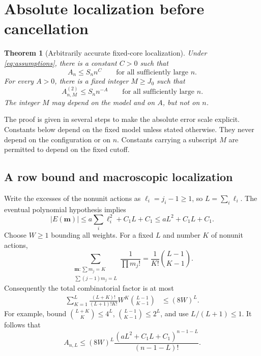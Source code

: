 \documentclass[11pt,a4paper]{article}
\numberwithin{equation}{section}
\newtheorem{theorem}{Theorem}[section]
\theoremstyle{definition}\newtheorem{definition}[theorem]{Definition}
\theoremstyle{remark}\newtheorem{remark}[theorem]{Remark}
\theoremstyle{definition}
\begin{document}
\section{Absolute localization before cancellation}
\label{sec:localization}

\begin{theorem}[Arbitrarily accurate fixed-core localization]
\label{thm:localization}
Under \eqref{eq:assumptions}, there is a constant \(C>0\) such that
\begin{equation}
 A_n\le S_n n^C
 \qquad\text{for all sufficiently large }n.
 \label{eq:absolute-total}
\end{equation}
For every \(A>0\), there is a fixed integer \(M\ge J_0\) such that
\begin{equation}
 A_{n,M}^{(2)}\le S_n n^{-A}
 \qquad\text{for all sufficiently large }n.
 \label{eq:two-tail}
\end{equation}
The integer \(M\) may depend on the model and on \(A\), but not on \(n\).
\end{theorem}

The proof is given in several steps to make the absolute error scale
explicit. Constants below depend on the fixed model unless stated otherwise.
They never depend on the configuration or on \(n\). Constants carrying a
subscript \(M\) are permitted to depend on the fixed cutoff.

\subsection{A row bound and macroscopic localization}
Write the excesses of the nonunit actions as \(\ell_i=j_i-1\ge1\),
so \(L=\sum_i\ell_i\). The eventual polynomial hypothesis implies
\begin{equation}
 |E(\bm m)|\le a\sum_i\ell_i^2+C_1L+C_1
                  \le aL^2+C_1L+C_1.
 \label{eq:Ebound}
\end{equation}
Choose \(W\ge1\) bounding all weights. For a fixed \(L\) and number \(K\)
of nonunit actions,
\[
 \sum_{\substack{\bm m:\sum m_j=K\\\sum(j-1)m_j=L}}
 \frac1{\prod m_j!}=\frac1{K!}\binom{L-1}{K-1}.
\]
Consequently the total combinatorial factor is at most
\begin{align}
 \sum_{K=1}^L\frac{(L+K)!}{(L+1)!K!}
       W^K\binom{L-1}{K-1}
 &\le (8W)^L. \label{eq:entropy}
\end{align}
For example, bound \(\binom{L+K}{K}\le4^L\),
\(\binom{L-1}{K-1}\le2^L\), and use \(L/(L+1)\le1\).
It follows that
\begin{equation}
 A_{n,L}\le (8W)^L
 \frac{(aL^2+C_1L+C_1)^{n-1-L}}{(n-1-L)!}.
 \label{eq:row}
\end{equation}
\end{document}
